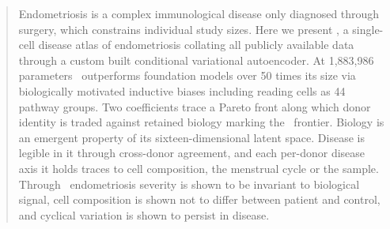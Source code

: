 %
%
%
%
%
%

\begin{abstract}
\noindent
Endometriosis is a complex immunological disease only diagnosed through
surgery, which constrains individual study sizes. Here we present \elaj, 
a single-cell disease atlas of endometriosis collating all publicly 
available data through a custom built conditional variational 
autoencoder. At 1{,}883{,}986 parameters \elaj\ outperforms foundation 
models over 50 times its size via biologically motivated
inductive biases including reading cells as 44 pathway groups.
Two coefficients trace a Pareto front along which donor identity is traded 
against retained biology marking the \elaj\ frontier. Biology is an emergent
property of its sixteen-dimensional latent space. Disease is legible
in it through cross-donor agreement, and each per-donor disease axis it
holds traces to cell composition, the menstrual cycle or the sample.
Through \elaj\ endometriosis severity is shown to be invariant to biological 
signal, cell composition is shown not to differ between patient and 
control, and cyclical variation is shown to persist in disease.
\end{abstract}
